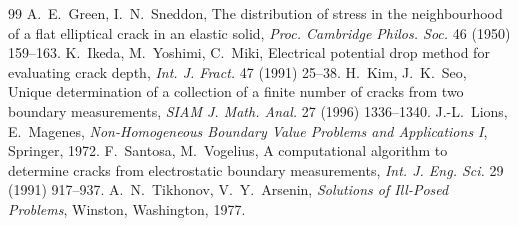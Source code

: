 \begin{chapterbib}{99}
 A.~E.~Green, I.~N.~Sneddon, The distribution of stress in the neighbourhood of a flat elliptical crack in an elastic solid, \emph{Proc. Cambridge Philos. Soc.} 46 (1950) 159--163.
 K.~Ikeda, M.~Yoshimi, C.~Miki, Electrical potential drop method for evaluating crack depth, \emph{Int. J. Fract.} 47 (1991) 25--38.
 H.~Kim, J.~K.~Seo, Unique determination of a collection of a finite number of cracks from two boundary measurements, \emph{SIAM J. Math. Anal.} 27 (1996) 1336--1340.
 J.-L.~Lions, E.~Magenes, \emph{Non-Homogeneous Boundary Value Problems and Applications I}, Springer, 1972.
 F.~Santosa, M.~Vogelius, A computational algorithm to determine cracks from electrostatic boundary measurements, \emph{Int. J. Eng. Sci.} 29 (1991) 917--937.
 A.~N.~Tikhonov, V.~Y.~Arsenin, \emph{Solutions of Ill-Posed Problems}, Winston, Washington, 1977.
\end{chapterbib}
